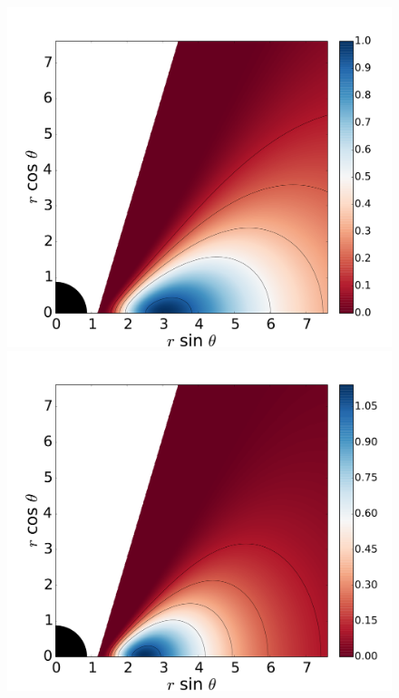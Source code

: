 \documentclass[twocolumn,aps,showpacs,showkeys,prd,superscriptaddress,byrevtex, amsmath]{revtex4-1}
\begin{document}
\begin{figure}
\includegraphics[scale=0.14]{figures/fig9_09_10.pdf}
\hspace{-0.3cm}
\includegraphics[scale=0.14]{figures/fig9_09_1.pdf}
\hspace{-0.2cm}

\end{figure}
\end{document}
